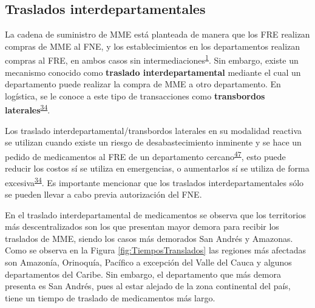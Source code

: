 \documentclass[
  oneside]{book}
\begin{document}
\hypertarget{traslados-interdepartamentales}{%
\subsection{Traslados interdepartamentales}\label{traslados-interdepartamentales}}

La cadena de suministro de MME está planteada de manera que los FRE realizan compras de MME al FNE, y los establecimientos en los departamentos realizan compras al FRE, en ambos casos sin intermediaciones\textsuperscript{\protect\hyperlink{ref-MSPS1478-2006}{1}}. Sin embargo, existe un mecanismo conocido como \textbf{traslado interdepartamental} mediante el cual un departamento puede realizar la compra de MME a otro departamento. En logística, se le conoce a este tipo de transacciones como \textbf{transbordos laterales}\textsuperscript{\protect\hyperlink{ref-Silver2017}{34}}.

Los traslado interdepartamental/transbordos laterales en su modalidad reactiva se utilizan cuando existe un riesgo de desabastecimiento inminente y se hace un pedido de medicamentos al FRE de un departamento cercano\textsuperscript{\protect\hyperlink{ref-Paterson2011}{47}}, esto puede reducir los costos sí se utiliza en emergencias, o aumentarlos sí se utiliza de forma excesiva\textsuperscript{\protect\hyperlink{ref-Silver2017}{34}}. Es importante mencionar que los traslados interdepartamentales sólo se pueden llevar a cabo previa autorización del FNE.

En el traslado interdepartamental de medicamentos se observa que los territorios más descentralizados son los que presentan mayor demora para recibir los traslados de MME, siendo los casos más demorados San Andrés y Amazonas. Como se observa en la Figura \ref{fig:TiemposTranslados} las regiones más afectadas son Amazonía, Orinoquía, Pacífico a excepción del Valle del Cauca y algunos departamentos del Caribe. Sin embargo, el departamento que más demora presenta es San Andrés, pues al estar alejado de la zona continental del país, tiene un tiempo de traslado de medicamentos más largo.
\end{document}
